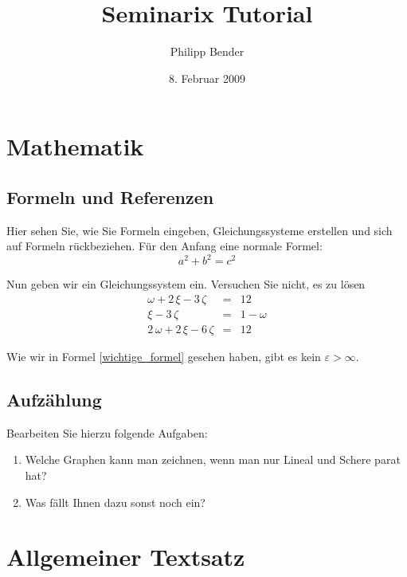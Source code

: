 \documentclass{scrartcl}
\title{Seminarix Tutorial}
\author{Philipp Bender}
\date{8. Februar 2009}
\begin{document}
\maketitle

\tableofcontents

\section{Mathematik}
\subsection{Formeln und Referenzen}
Hier sehen Sie, wie Sie Formeln eingeben, Gleichungssysteme erstellen und sich auf Formeln rückbeziehen. Für den Anfang eine normale Formel:
\begin{equation} %
\label{wichtige_formel}
	a^2+b^2=c^2
\end{equation} %

Nun geben wir ein Gleichungssystem ein. Versuchen Sie nicht, es zu lösen 
\begin{eqnarray}
	\omega + 2\, \xi - 3\, \zeta & = & 12 \\
\xi - 3\, \zeta & = & 1 - \omega \\
2\, \omega + 2\, \xi - 6\, \zeta & = & 12
\end{eqnarray}

Wie wir in Formel \ref{wichtige_formel} gesehen haben, gibt es kein $\varepsilon > \infty$.

\subsection{Aufzählung}

Bearbeiten Sie hierzu folgende Aufgaben:
\begin{enumerate}[1)]
	\item Welche Graphen kann man zeichnen, wenn man nur Lineal und Schere parat hat?
	\item Was fällt Ihnen dazu sonst noch ein?
\end{enumerate}

\section{Allgemeiner Textsatz}
\end{document}

